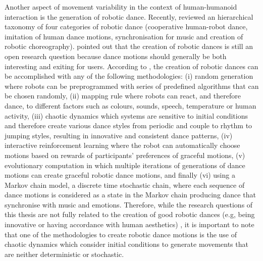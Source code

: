 Another aspect of movement variability in the context of human-humanoid 
interaction is the generation of robotic dance.
Recently, \cite{peng2015} reviewed an hierarchical taxonomy of 
four categories of robotic dance (cooperative human-robot dance, 
imitation of human dance motions, synchronisation for music and 
creation of robotic choreography).
\cite{peng2015} pointed out that the creation of robotic dances is still 
an open research question because dance motions should generally be both 
interesting and exiting for users. 
According to \cite{peng2015}, the creation of robotic dances can be 
accomplished with any of the following methodologies:
(i) random generation where robots can be 
preprogrammed with series of predefined algorithms that can be chosen randomly,
(ii) mapping rule where robots can react, and therefore dance, to different 
factors such as colours, sounds, speech, temperature or human activity,
(iii) chaotic dynamics which systems are sensitive to initial conditions and 
therefore create various dance styles from periodic and couple to rhythm to 
jumping styles, resulting in innovative and consistent dance patterns,
(iv) interactive reinforcement learning where the robot can automatically choose 
motions based on rewards of participants' preferences 
of graceful motions,
(v) evolutionary computation in which multiple iterations of generations
of dance motions can create graceful robotic dance motions, and
finally (vi) using a Markov chain model, a discrete time stochastic chain, 
where each sequence of dance motions is considered as a state in the Markov 
chain producing dance that synchronise with music and emotions.
Therefore, while the research questions of this thesis are not fully related 
to the creation of good robotic dances (e.g, being innovative or having 
accordance with human aesthetics) \citep{peng2015}, it is important to note 
that one of the methodologies to create robotic dance motions is the use of 
chaotic dynamics
which consider initial conditions to generate movements 
that are neither deterministic or stochastic.


